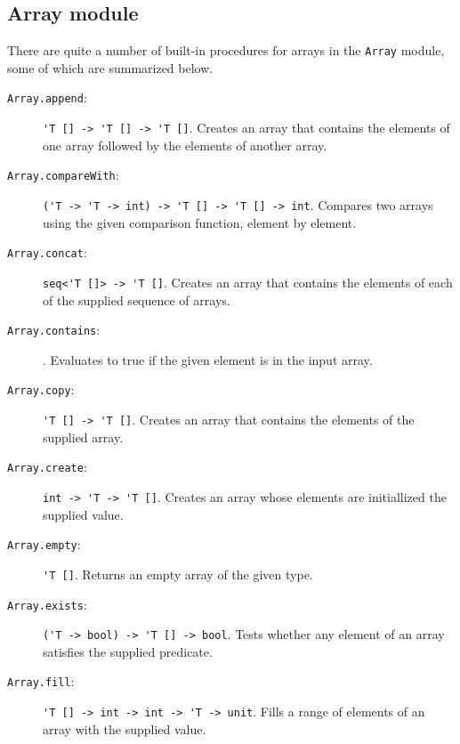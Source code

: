 \subsection{Array module}
There are quite a number of built-in procedures for arrays in the \lstinline{Array} module, some of which are summarized below.
\begin{description}
\item[\texttt{Array.append}:] \lstinline{'T [] -> 'T [] -> 'T []}. Creates an array that contains the elements of one array followed by the elements of another array.
\item[\texttt{Array.compareWith}:] \lstinline{('T -> 'T -> int) -> 'T [] -> 'T [] -> int}. Compares two arrays using the given comparison function, element by element.
\item[\texttt{Array.concat}:] \lstinline{seq<'T []> -> 'T []}. Creates an array that contains the elements of each of the supplied sequence of arrays.
\item[\texttt{Array.contains}:] \lstinline{}. Evaluates to true if the given element is in the input array.
\item[\texttt{Array.copy}:] \lstinline{'T [] -> 'T []}. Creates an array that contains the elements of the supplied array.
\item[\texttt{Array.create}:] \lstinline{int -> 'T -> 'T []}. Creates an array whose elements are initiallized the supplied value.
\item[\texttt{Array.empty}:] \lstinline{'T []}. Returns an empty array of the given type.
\item[\texttt{Array.exists}:] \lstinline{('T -> bool) -> 'T [] -> bool}. Tests whether any element of an array satisfies the supplied predicate.
\item[\texttt{Array.fill}:] \lstinline{'T [] -> int -> int -> 'T -> unit}. Fills a range of elements of an array with the supplied value.

\end{description}
